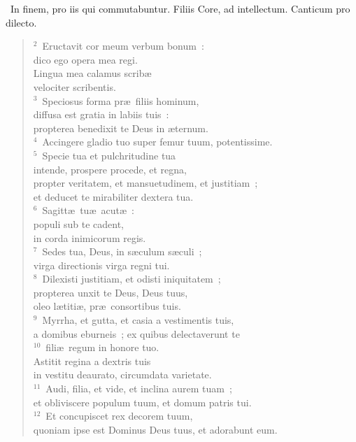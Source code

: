 ~\lettrine[lines=10,image=true,loversize=0.05,lraise=-0.03]{I}{}n finem, pro iis qui commutabuntur. Filiis Core, ad intellectum. Canticum pro dilecto.
\begin{flushleft}\begin{verse}\vspace{6pt}${}^{2}$~Eructavit cor meum verbum bonum~:\\ dico ego opera mea regi.\\ Lingua mea calamus scrib\ae \\ velociter scribentis.\\
${}^{3}$~Speciosus forma pr\ae\ filiis hominum,\\ diffusa est gratia in labiis tuis~:\\ propterea benedixit te Deus in \ae ternum.\\
${}^{4}$~Accingere gladio tuo super femur tuum, potentissime.\\
${}^{5}$~Specie tua et pulchritudine tua\\ intende, prospere procede, et regna,\\ propter veritatem, et mansuetudinem, et justitiam~;\\ et deducet te mirabiliter dextera tua.\\
${}^{6}$~Sagitt\ae\ tu\ae\ acut\ae~:\\ populi sub te cadent,\\ in corda inimicorum regis.\\
${}^{7}$~Sedes tua, Deus, in s\ae culum s\ae culi~;\\ virga directionis virga regni tui.\\
${}^{8}$~Dilexisti justitiam, et odisti iniquitatem~;\\ propterea unxit te Deus, Deus tuus,\\ oleo l\ae titi\ae , pr\ae\ consortibus tuis.\\
${}^{9}$~Myrrha, et gutta, et casia a vestimentis tuis,\\ a domibus eburneis~; ex quibus delectaverunt te\\
${}^{10}$~fili\ae\ regum in honore tuo.\\ Astitit regina a dextris tuis\\ in vestitu deaurato, circumdata varietate.\\
${}^{11}$~Audi, filia, et vide, et inclina aurem tuam~;\\ et obliviscere populum tuum, et domum patris tui.\\
${}^{12}$~Et concupiscet rex decorem tuum,\\ quoniam ipse est Dominus Deus tuus, et adorabunt eum.\\

\end{verse}
\end{flushleft}
